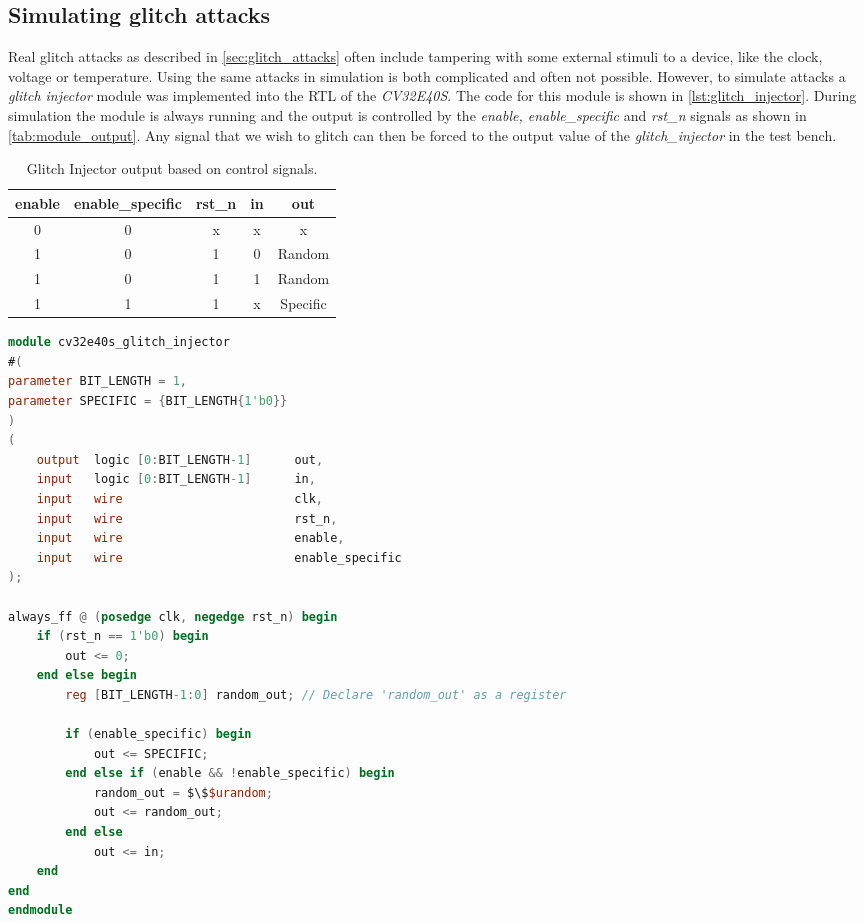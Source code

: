 \subsection{Simulating glitch attacks}
\label{subsec:sim_glitch}

Real glitch attacks as described in \autoref{sec:glitch_attacks} often include tampering with some external stimuli to a device, like the clock, voltage or temperature. Using the same attacks in simulation is both complicated and often not possible. However, to simulate attacks a \textit{glitch injector} module was implemented into the RTL of the \textit{CV32E40S}. The code for this module is shown in \autoref{lst:glitch_injector}. During simulation the module is always running and the output is controlled by the \textit{enable, enable\_specific} and \textit{rst\_n} signals as shown in \autoref{tab:module_output}. Any signal that we wish to glitch can then be forced to the output value of the \textit{glitch\_injector} in the test bench. 

\begin{table}[h]
\centering
\caption{Glitch Injector output based on control signals.}
\label{tab:module_output}
\begin{tabular}{ccccc}
\toprule 
\rowcolor{black!20} \textbf{enable} & \textbf{enable\_specific} & \textbf{rst\_n} & \textbf{in} & \textbf{out} \\
\midrule
0 & 0 & x & x & x \\
\rowcolor{black!20} 1 & 0 & 1 & 0 & Random \\
1 & 0 & 1 & 1 & Random \\
\rowcolor{black!20} 1 & 1 & 1 & x & Specific \\
\bottomrule
\end{tabular}
\end{table}

\begin{lstlisting}[caption={SystemVerilog code for the glitch\_injector module}, label=lst:glitch_injector, language=verilog]
module cv32e40s_glitch_injector 
#(
parameter BIT_LENGTH = 1, 
parameter SPECIFIC = {BIT_LENGTH{1'b0}}
)
(
    output  logic [0:BIT_LENGTH-1]      out,
    input   logic [0:BIT_LENGTH-1]      in,
    input   wire                        clk,
    input   wire                        rst_n,
    input   wire                        enable,
    input   wire                        enable_specific    
);

always_ff @ (posedge clk, negedge rst_n) begin 
    if (rst_n == 1'b0) begin 
        out <= 0;
    end else begin
        reg [BIT_LENGTH-1:0] random_out; // Declare 'random_out' as a register

        if (enable_specific) begin
            out <= SPECIFIC;
        end else if (enable && !enable_specific) begin
            random_out = $\$$urandom;
            out <= random_out; 
        end else
            out <= in;  
    end
end
endmodule
\end{lstlisting}

